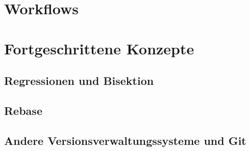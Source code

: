 \section{Workflows}
\label{sec:Workflows}
\section{Fortgeschrittene Konzepte}
\label{sec:FortgeschritteneKonzepte}
\subsection{Regressionen und Bisektion}
\label{sec:Regressionen}
\subsection{Rebase}
\label{sec:Rebase}
\subsection{Andere Versionsverwaltungssysteme und Git}
\label{sec:AndereVersionsverwaltungssystemeundGit}
